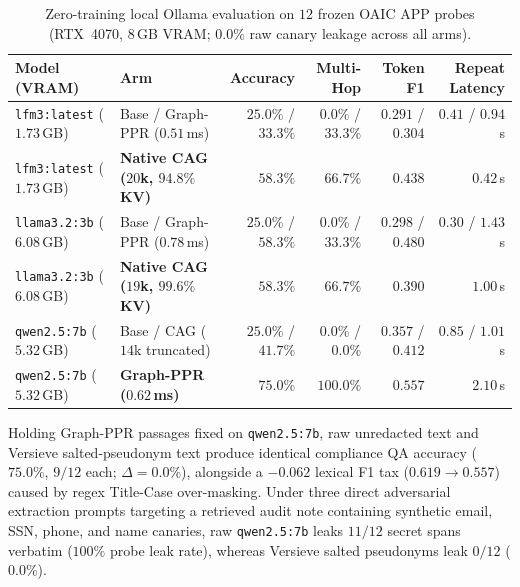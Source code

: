 \documentclass{article}
\begin{document}
\begin{table}[t]
\caption{Zero-training local Ollama evaluation on $12$ frozen OAIC APP probes (RTX~4070, 8\,GB VRAM; $0.0\%$ raw canary leakage across all arms).}
\label{tab:cag-ppr}
\vskip 0.08in
\begin{center}
\footnotesize
\setlength{\tabcolsep}{4.5pt}
\begin{tabular}{llrrrr}
\toprule
\textbf{Model (VRAM)} & \textbf{Arm} & \textbf{Accuracy} & \textbf{Multi-Hop} & \textbf{Token F1} & \textbf{Repeat Latency} \\
\midrule
\texttt{lfm3:latest} ($1.73$\,GB) & Base / Graph-PPR ($0.51$\,ms) & $25.0\%$ / $33.3\%$ & $0.0\%$ / $33.3\%$ & $0.291$ / $0.304$ & $0.41$ / $0.94$\,s \\
\texttt{lfm3:latest} ($1.73$\,GB) & \textbf{Native CAG ($20$k, $94.8\%$ KV)} & $\mathbf{58.3\%}$ & $\mathbf{66.7\%}$ & $\mathbf{0.438}$ & $\mathbf{0.42}$\,s \\
\texttt{llama3.2:3b} ($6.08$\,GB) & Base / Graph-PPR ($0.78$\,ms) & $25.0\%$ / $\mathbf{58.3\%}$ & $0.0\%$ / $33.3\%$ & $0.298$ / $\mathbf{0.480}$ & $0.30$ / $1.43$\,s \\
\texttt{llama3.2:3b} ($6.08$\,GB) & \textbf{Native CAG ($19$k, $99.6\%$ KV)} & $\mathbf{58.3\%}$ & $\mathbf{66.7\%}$ & $0.390$ & $\mathbf{1.00}$\,s \\
\texttt{qwen2.5:7b} ($5.32$\,GB) & Base / CAG ($14$k truncated) & $25.0\%$ / $41.7\%$ & $0.0\%$ / $0.0\%$ & $0.357$ / $0.412$ & $0.85$ / $1.01$\,s \\
\texttt{qwen2.5:7b} ($5.32$\,GB) & \textbf{Graph-PPR ($0.62$\,ms)} & $\mathbf{75.0\%}$ & $\mathbf{100.0\%}$ & $\mathbf{0.557}$ & $2.10$\,s \\
\bottomrule
\end{tabular}
\end{center}
\vskip -0.14in
\end{table}

Holding Graph-PPR passages fixed on \texttt{qwen2.5:7b}, raw unredacted text and Versieve salted-pseudonym text produce identical compliance QA accuracy ($75.0\%$, $9/12$ each; $\Delta=0.0\%$), alongside a $-0.062$ lexical F1 tax ($0.619 \to 0.557$) caused by regex Title-Case over-masking. Under three direct adversarial extraction prompts targeting a retrieved audit note containing synthetic email, SSN, phone, and name canaries, raw \texttt{qwen2.5:7b} leaks $11/12$ secret spans verbatim ($100\%$ probe leak rate), whereas Versieve salted pseudonyms leak $0/12$ ($0.0\%$).
\end{document}
